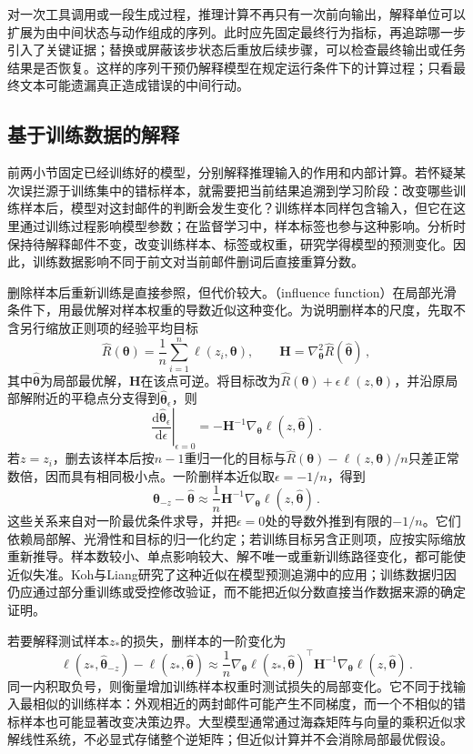 对一次工具调用或一段生成过程，推理计算不再只有一次前向输出，解释单位可以扩展为由中间状态与动作组成的序列。此时应先固定最终行为指标，再追踪哪一步引入了关键证据；替换或屏蔽该步状态后重放后续步骤，可以检查最终输出或任务结果是否恢复。这样的序列干预仍解释模型在规定运行条件下的计算过程；只看最终文本可能遗漏真正造成错误的中间行动。

\subsection{基于训练数据的解释}
\label{sec:interpretability-local-training}

前两小节固定已经训练好的模型，分别解释推理输入的作用和内部计算。若怀疑某次误拦源于训练集中的错标样本，就需要把当前结果追溯到学习阶段：改变哪些训练样本后，模型对这封邮件的判断会发生变化？训练样本同样包含输入，但它在这里通过训练过程影响模型参数；在监督学习中，样本标签也参与这种影响。分析时保持待解释邮件不变，改变训练样本、标签或权重，研究学得模型的预测变化。因此，训练数据影响不同于前文对当前邮件删词后直接重算分数。

删除样本后重新训练是直接参照，但代价较大。（influence function）在局部光滑条件下，用最优解对样本权重的导数近似这种变化。为说明删样本的尺度，先取不含另行缩放正则项的经验平均目标
\[
 \hat R(\bm{\theta})=\frac1n\sum_{i=1}^n\ell(z_i,\bm{\theta}),
 \qquad
 \bm H=\nabla_{\bm{\theta}}^2\hat R(\hat{\bm{\theta}})\, ,
\]
其中$\hat{\bm{\theta}}$为局部最优解，$\bm H$在该点可逆。将目标改为$\hat R(\bm{\theta})+\epsilon\ell(z,\bm{\theta})$，并沿原局部解附近的平稳点分支得到$\hat{\bm{\theta}}_\epsilon$，则
\[
 \left.\frac{\mathrm d\hat{\bm{\theta}}_\epsilon}
 {\mathrm d\epsilon}\right|_{\epsilon=0}
 =-\bm H^{-1}\nabla_{\bm{\theta}}
       \ell(z,\hat{\bm{\theta}})\, .
\]
若$z=z_i$，删去该样本后按$n-1$重归一化的目标与$\hat R(\bm{\theta})-\ell(z,\bm{\theta})/n$只差正常数倍，因而具有相同极小点。一阶删样本近似取$\epsilon=-1/n$，得到
\[
 \hat{\bm{\theta}}_{-z}-\hat{\bm{\theta}}
 \approx\frac1n\bm H^{-1}\nabla_{\bm{\theta}}
 \ell(z,\hat{\bm{\theta}})\, .
\]
这些关系来自对一阶最优条件求导，并把$\epsilon=0$处的导数外推到有限的$-1/n$。它们依赖局部解、光滑性和目标的归一化约定；若训练目标另含正则项，应按实际缩放重新推导。样本数较小、单点影响较大、解不唯一或重新训练路径变化，都可能使近似失准。Koh与Liang研究了这种近似在模型预测追溯中的应用；训练数据归因仍应通过部分重训练或受控修改验证，而不能把近似分数直接当作数据来源的确定证明。

若要解释测试样本$z_*$的损失，删样本的一阶变化为
\[
 \ell(z_*,\hat{\bm{\theta}}_{-z})
 -\ell(z_*,\hat{\bm{\theta}})
 \approx\frac1n\nabla_{\bm\theta}\ell(z_*,\hat{\bm\theta})^\top
 \bm H^{-1}\nabla_{\bm\theta}\ell(z,\hat{\bm\theta})\, .
\]
同一内积取负号，则衡量增加训练样本权重时测试损失的局部变化。它不同于找输入最相似的训练样本：外观相近的两封邮件可能产生不同梯度，而一个不相似的错标样本也可能显著改变决策边界。大型模型通常通过海森矩阵与向量的乘积近似求解线性系统，不必显式存储整个逆矩阵；但近似计算并不会消除局部最优假设。

